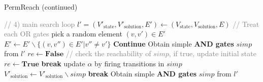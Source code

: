\clearpage

\begin{algorithm}
  \caption{PermReach (continued)}
  \begin{algorithmic}
\State \textcolor{gray}{// 4) main search loop} %
    \State $l'=(V'_{\mathrm{state}}, V'_{\mathrm{solution}},E')\gets(V_{\mathrm{state}}, V_{\mathrm{solution}},E)$
     \textcolor{gray}{// Treat each OR gates}
        \State pick a random element $(v,v') \in E'$
        \State $E'\gets E' \backslash  \{(v,v'') \in E'| v''\neq v'\}$
    \EndFor
        \State \textbf{Continue}
    \EndIf
    \State Obtain simple \textbf{AND gates} $simp$ from $l'$
        \State $re\gets\mathbf{False}$ \textcolor{gray}{// check the reachability of $simp$, if true, update initial state}
                \State $re\gets\mathbf{True}$
                \State \textbf{break}
            \EndIf
        \EndFor
            \State update $\alpha$ by firing transitions in $simp$
            \State $V'_{\mathrm{solution}}\gets V'_{\mathrm{solution}} \backslash simp$
        \Else
            \State \textbf{break}
        \EndIf
        \State Obtain simple \textbf{AND gates} $simp$ from $l'$
    \EndWhile
    \EndIf
\EndFor %
\State {}
  \end{algorithmic}
\end{algorithm}

